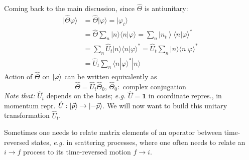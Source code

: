 \documentclass[12pt]{article}
\newcommand{\be}{\begin{equation}}
\newcommand{\ee}{\end{equation}}
\begin{document}
Coming back to the main discussion, since $\hat{\Theta}$ is antiunitary:
\be
\begin{aligned}
|\hat{\Theta} \varphi\rangle 
&=\hat{\Theta}|\varphi\rangle=|\varphi_{t}\rangle \\ 
&=\hat{\Theta} \sum_{n}|n\rangle\langle n | \varphi\rangle=\sum_{n}\left|n_{t}\right\rangle\langle n | \varphi\rangle^{*} \\
&=\sum_{n} \hat{U}_{t}|n\rangle\langle n | \varphi\rangle^{*} =\hat{U}_{t} \sum_{n}|n\rangle\langle n | \varphi\rangle^{*} \\ 
&=\hat{U}_{t} \sum_{n}\langle n | \varphi\rangle^{*}|n\rangle
\end{aligned}
\label{eq:g114}
\ee
%
%
Action of $\hat{\Theta}$ on $\ket{\varphi}$ can be written equivalently as
\be
\hat{\Theta} = \hat{U}_t \hat{\Theta}_0,\,\hat{\Theta}_0:\text{ complex conjugation}
\ee
\emph{Note that:} $\hat{U}_t$ depends on the basis; \textit{e.g.} $\hat{U} = \mathbf{1}$ in
coordinate repres., in momentum repr. $\hat{U}: \ket{\vec{p}} \to \ket{-\vec{p}}$.
We will now want to build this unitary transformation $\hat{U}_t$.


Sometimes one needs to relate matrix elements of
an operator between time-reversed states, \textit{e.g.} in
scattering processes, where one often needs to relate
an $i \rightarrow f$ process to its time-reversed motion $f \rightarrow i$.
\end{document}
